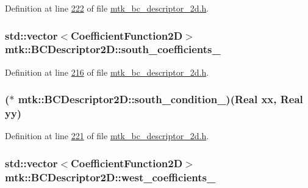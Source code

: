Definition at line \hyperlink{mtk__bc__descriptor__2d_8h_source_l00222}{222} of file \hyperlink{mtk__bc__descriptor__2d_8h_source}{mtk\+\_\+bc\+\_\+descriptor\+\_\+2d.\+h}.

\hypertarget{classmtk_1_1BCDescriptor2D_a263309b9ad288dc89826d818d9378d07}{
\subsubsection[{south\+\_\+coefficients\+\_\+}]{\setlength{\rightskip}{0pt plus 5cm}std\+::vector$<${\bf Coefficient\+Function2\+D}$>$ mtk\+::\+B\+C\+Descriptor2\+D\+::south\+\_\+coefficients\+\_\+\hspace{0.3cm}{\ttfamily [private]}}}\label{classmtk_1_1BCDescriptor2D_a263309b9ad288dc89826d818d9378d07}


Definition at line \hyperlink{mtk__bc__descriptor__2d_8h_source_l00216}{216} of file \hyperlink{mtk__bc__descriptor__2d_8h_source}{mtk\+\_\+bc\+\_\+descriptor\+\_\+2d.\+h}.

\hypertarget{classmtk_1_1BCDescriptor2D_a2a933b473abbe47ad7c79ef7939e7768}{
\subsubsection[{south\+\_\+condition\+\_\+}]{($\ast$ mtk\+::\+B\+C\+Descriptor2\+D\+::south\+\_\+condition\+\_\+)({\bf Real} xx, {\bf Real} yy)\hspace{0.3cm}{\ttfamily [private]}}}\label{classmtk_1_1BCDescriptor2D_a2a933b473abbe47ad7c79ef7939e7768}


Definition at line \hyperlink{mtk__bc__descriptor__2d_8h_source_l00221}{221} of file \hyperlink{mtk__bc__descriptor__2d_8h_source}{mtk\+\_\+bc\+\_\+descriptor\+\_\+2d.\+h}.

\hypertarget{classmtk_1_1BCDescriptor2D_a7df71b43acc25c468683075cc7790bb2}{
\subsubsection[{west\+\_\+coefficients\+\_\+}]{\setlength{\rightskip}{0pt plus 5cm}std\+::vector$<${\bf Coefficient\+Function2\+D}$>$ mtk\+::\+B\+C\+Descriptor2\+D\+::west\+\_\+coefficients\+\_\+\hspace{0.3cm}{\ttfamily [private]}}}\label{classmtk_1_1BCDescriptor2D_a7df71b43acc25c468683075cc7790bb2}


